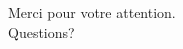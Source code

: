 \begin{frame}
\begin{center}
\Huge Merci pour votre attention.\\
Questions?
\end{center}
\end{frame}
